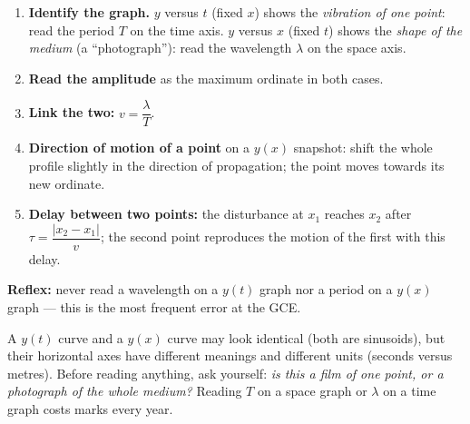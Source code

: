 \documentclass[11pt]{article}
\begin{document}
\begin{methode}
\begin{enumerate}
\item \textbf{Identify the graph.} $y$ versus $t$ (fixed $x$) shows the \emph{vibration of one point}: read the period $T$ on the time axis. $y$ versus $x$ (fixed $t$) shows the \emph{shape of the medium} (a ``photograph''): read the wavelength $\lambda$ on the space axis.
\item \textbf{Read the amplitude} as the maximum ordinate in both cases.
\item \textbf{Link the two:} $v=\dfrac{\lambda}{T}$.
\item \textbf{Direction of motion of a point} on a $y(x)$ snapshot: shift the whole profile slightly in the direction of propagation; the point moves towards its new ordinate.
\item \textbf{Delay between two points:} the disturbance at $x_1$ reaches $x_2$ after $\tau=\dfrac{|x_2-x_1|}{v}$; the second point reproduces the motion of the first with this delay.
\end{enumerate}
\textbf{Reflex:} never read a wavelength on a $y(t)$ graph nor a period on a $y(x)$ graph — this is the most frequent error at the GCE.
\end{methode}

\begin{attention}
A $y(t)$ curve and a $y(x)$ curve may look identical (both are sinusoids), but their horizontal axes have different meanings and different units (seconds versus metres). Before reading anything, ask yourself: \emph{is this a film of one point, or a photograph of the whole medium?} Reading $T$ on a space graph or $\lambda$ on a time graph costs marks every year.
\end{attention}
\end{document}
